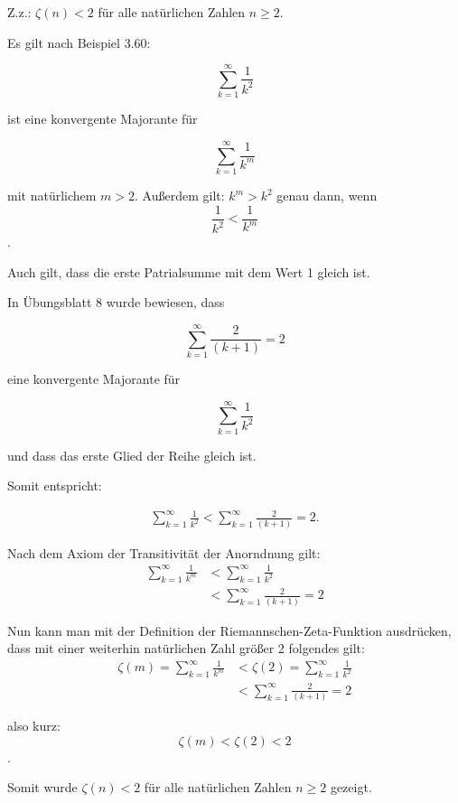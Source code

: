 \bigskip

\begin{lsg}

Z.z.: $\zeta(n) < 2$ f\"ur alle nat\"urlichen Zahlen $n\geq 2$. 


Es gilt nach Beispiel 3.60: 

\[ \displaystyle\sum_{k=1}^{\infty}\frac{1}{k^{2}}\]

ist eine konvergente Majorante für

\[ \displaystyle\sum_{k=1}^{\infty}\frac{1}{k^{m}}\] 

mit natürlichem $m > 2$. Außerdem gilt: $k^m > k^2$  genau dann, wenn  
$$\frac{1}{k^2} < \frac{1}{k^m}$$.

Auch gilt, dass die erste Patrialsumme mit dem Wert 1 gleich ist.

In Übungsblatt 8 wurde bewiesen, dass 

\[ \displaystyle\sum_{k=1}^{\infty}\frac{2}{(k+1)}=2\]

eine konvergente Majorante für 

\[ \displaystyle\sum_{k=1}^{\infty}\frac{1}{k^{2}}\]

und dass das erste Glied der Reihe gleich ist.

Somit entspricht: 


\begin{align*}
 \displaystyle\sum_{k=1}^{\infty}\frac{1}{k^{2}} < 
\displaystyle\sum_{k=1}^{\infty}\frac{2}{(k+1)}=2.
\end{align*}

Nach dem Axiom der Transitivität der Anorndnung gilt: 
\begin{align*}
\displaystyle\sum_{k=1}^{\infty}\frac{1}{k^{m}} 
& < \displaystyle\sum_{k=1}^{\infty}\frac{1}{k^{2}}
\\
& < \displaystyle\sum_{k=1}^{\infty}\frac{2}{(k+1)}=2
\end{align*}

Nun kann man mit der Definition der Riemannschen-Zeta-Funktion ausdrücken, dass 
mit einer weiterhin natürlichen Zahl größer 2 folgendes gilt:
\begin{align*}
 \zeta(m) = \displaystyle\sum_{k=1}^{\infty}\frac{1}{k^{m}}
& <
\zeta(2) = \displaystyle\sum_{k=1}^{\infty}\frac{1}{k^{2}}
\\ 
& <
\displaystyle\sum_{k=1}^{\infty}\frac{2}{(k+1)}=2
\end{align*}

also kurz: $$ \zeta(m) < \zeta(2) < 2 $$.

Somit wurde $\zeta(n) < 2$ f\"ur alle nat\"urlichen Zahlen $n\geq 2$ gezeigt.
\end{lsg}
 
